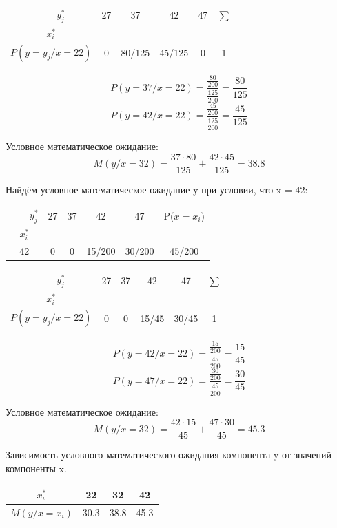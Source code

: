 \documentclass{article}
\begin{document}
\begin{table}[H]
    \centering
    \begin{tabular}{|c|c|c|c|c|c|}
    \hline
     \ \ \ \ $y_j^*$&  27&  37&  42& 47 & $\sum$\\
    $x_i^*$&  &  &  & &\\
    \hline
    $P(y=y_j / x = 22)$&  0&  80/125&  45/125& 0& 1\\
    \hline
    \end{tabular}
\end{table}

\[P(y=37 / x = 22) = \frac{\frac{80}{200}}{\frac{125}{200}} = \frac{80}{125}\]
\[P(y=42 / x = 22) = \frac{\frac{45}{200}}{\frac{125}{200}} = \frac{45}{125}\]

Условное математическое ожидание:
\[M(y/x=32) = \frac{37\cdot 80}{125} + \frac{42\cdot 45}{125} = 38.8\]

Найдём условное математическое ожидание y при условии, что x = 42:

\begin{table}[H]
    \centering
    \begin{tabular}{|c|c|c|c|c|c|}
    \hline
     \ \ \ \ $y_j^*$&  27&  37&  42& 47& P($x=x_i$)\\
    $x_i^*$&  &  &  & &\\
    \hline
    42&  0&  0&  15/200& 30/200& 45/200\\
    \hline
    \end{tabular}
\end{table}

\begin{table}[H]
    \centering
    \begin{tabular}{|c|c|c|c|c|c|}
    \hline
     \ \ \ \ $y_j^*$&  27&  37&  42& 47 & $\sum$\\
    $x_i^*$&  &  &  & &\\
    \hline
    $P(y=y_j / x = 22)$&  0&  0&  15/45& 30/45& 1\\
    \hline
    \end{tabular}
\end{table}

\[P(y=42 / x = 22) = \frac{\frac{15}{200}}{\frac{45}{200}} = \frac{15}{45}\]
\[P(y=47 / x = 22) = \frac{\frac{30}{200}}{\frac{45}{200}} = \frac{30}{45}\]

Условное математическое ожидание:
\[M(y/x=32) = \frac{42\cdot 15}{45} + \frac{47\cdot 30}{45} = 45.3\]

Зависимость условного математического ожидания компонента y от значений компоненты x.
\begin{table}[H]
    \centering
    \begin{tabular}{|c|c|c|c|}
    \hline
    $x_i^*$&  22&  32&  42\\
    \hline
    $M(y/x=x_i)$ &30.3& 38.8& 45.3\\
    \hline
    \end{tabular}
\end{table}
\end{document}
